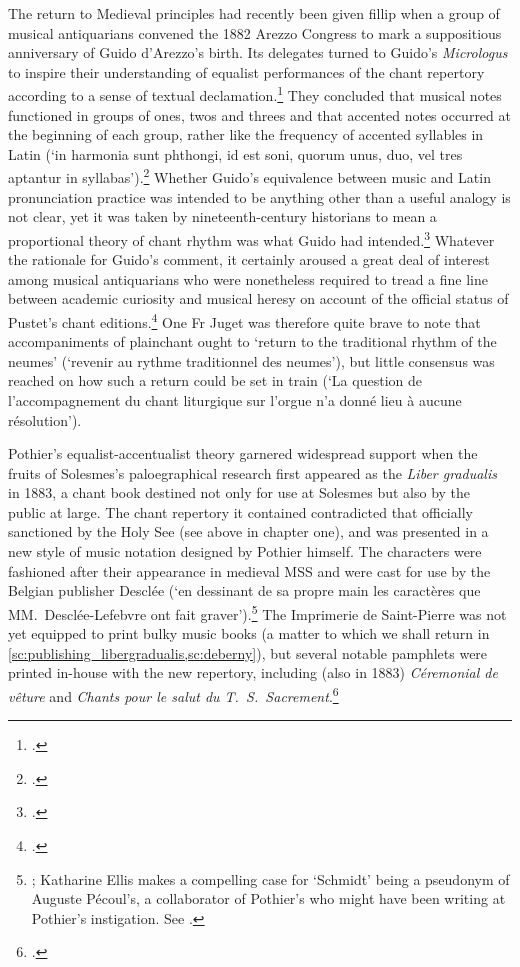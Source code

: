 The return to Medieval principles had recently been given fillip when a group of musical antiquarians convened the 1882 Arezzo Congress to mark a suppositious anniversary of Guido d'Arezzo's birth.
Its delegates turned to Guido's \emph{Micrologus} to inspire their understanding of equalist performances of the chant repertory according to a sense of textual declamation.\footcite[13, 43]{RuellecongreseuropeenArezzo1884}
They concluded that musical notes functioned in groups of ones, twos and threes and that accented notes occurred at the beginning of each group, rather like the frequency of accented syllables in Latin (`in harmonia sunt phthongi, id est soni, quorum unus, duo, vel tres aptantur in syllabas').\footcites[34--5]{DArezzoMicrologus1904}[French translation in][38--41]{RuellecongreseuropeenArezzo1884}
Whether Guido's equivalence between music and Latin pronunciation practice was intended to be anything other than a useful analogy is not clear, yet it was taken by nineteenth-century historians to mean a proportional theory of chant rhythm was what Guido had intended.\footcite[54--5 70]{PaliscaHucbaldGuidoJohn1978}
Whatever the rationale for Guido's comment, it certainly aroused a great deal of interest among musical antiquarians who were nonetheless required to tread a fine line between academic curiosity and musical heresy on account of the official status of Pustet's chant editions.\footcite[39]{BergeronDecadentEnchantmentsRevival1998}
One Fr Juget was therefore quite brave to note that accompaniments of plainchant ought to `return to the traditional rhythm of the neumes' (`revenir au rythme traditionnel des neumes'), but little consensus was reached on how such a return could be set in train (`La question de l'accompagnement du chant liturgique sur l'orgue n'a donné lieu à aucune résolution').

Pothier's equalist-accentualist theory garnered widespread support when the fruits of Solesmes's paloegraphical research first appeared as the \emph{Liber gradualis} in 1883, a chant book destined not only for use at Solesmes but also by the public at large.
The chant repertory it contained contradicted that officially sanctioned by the Holy See (see above in chapter one), and was presented in a new style of music notation designed by Pothier himself.
The characters were fashioned after their appearance in medieval MSS and were cast for use by the Belgian publisher Desclée (`en dessinant de sa propre main les caractères que MM.\ Desclée-Lefebvre ont fait graver').\footnote{\cite[37]{Schmidttypographieplainchant1895}; Katharine Ellis makes a compelling case for `Schmidt' being a pseudonym of Auguste Pécoul's, a collaborator of Pothier's who might have been writing at Pothier's instigation. See \cites[9]{EllisPoliticsPlainchantfindesiecle2013}[58]{BergeronDecadentEnchantmentsRevival1998}.}%
The Imprimerie de Saint-Pierre was not yet equipped to print bulky music books (a matter to which we shall return in \cref{sc:publishing_libergradualis,sc:deberny}), but several notable pamphlets were printed in-house with the new repertory, including (also in 1883) \emph{Céremonial de vêture} and \emph{Chants pour le salut du T.~S.~Sacrement}.\footcite[14]{OuryimprimerieAbbaye18801979}


